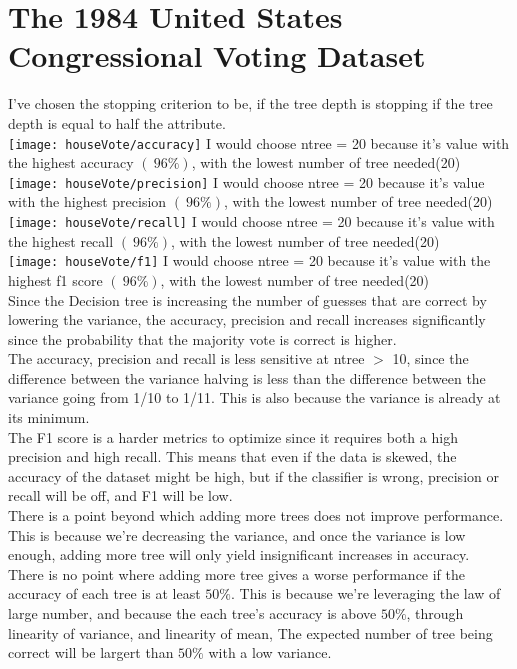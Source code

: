 \documentclass[letter]{amsart}
\begin{document}
\newpage
\section{The 1984 United States Congressional Voting Dataset}
I've chosen the stopping criterion to be, if the tree depth is stopping if the tree depth is equal to half the attribute.\\
\texttt{[image: houseVote/accuracy]}
I would choose ntree = 20 because it's value with the highest accuracy $(~96\%)$, with the lowest number of tree needed(20)\\
\texttt{[image: houseVote/precision]}
I would choose ntree = 20 because it's value with the highest precision $(~96\%)$, with the lowest number of tree needed(20)\\
\texttt{[image: houseVote/recall]}
I would choose ntree = 20 because it's value with the highest recall $(~96\%)$, with the lowest number of tree needed(20)\\
\texttt{[image: houseVote/f1]}
I would choose ntree = 20 because it's value with the highest f1 score $(~96\%)$, with the lowest number of tree needed(20)\\


Since the Decision tree is increasing the number of guesses that are correct by lowering the variance,
the accuracy, precision and recall increases significantly since the probability that the majority vote is correct is higher.\\
The accuracy, precision and recall is less sensitive at ntree $>$ 10, since the difference between the variance halving is less than
the difference between the variance going from 1/10 to 1/11. This is also because the variance is already at its minimum.\\
The F1 score is a harder metrics to optimize since it requires both a high precision and high recall. This means that even if the data is skewed,
the accuracy of the dataset might be high, but if the classifier is wrong, precision or recall will be off, and F1 will be low.\\
There is a point beyond which adding more trees does not improve performance. This is because we're decreasing the variance, and once the variance is low enough, adding more tree will only yield insignificant increases in accuracy.\\
There is no point where adding more tree gives a worse performance if the accuracy of each tree is at least $50\%$.
This is because we're leveraging the law of large number, and because the each tree's accuracy is above $50\%$, through linearity of variance, and linearity of mean,
The expected number of tree being correct will be largert than $50\%$ with a low variance.\\
\end{document}
